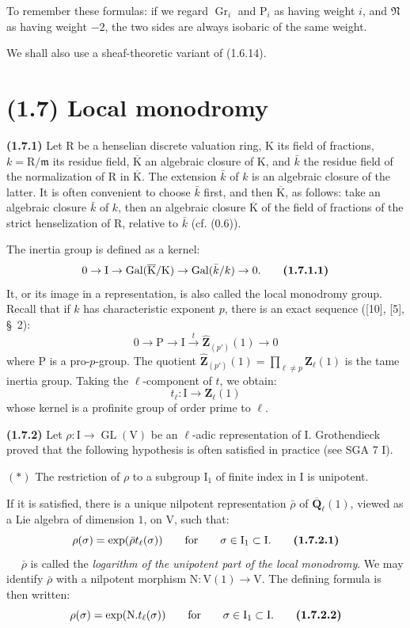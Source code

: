 \documentclass[11pt,leqno]{article}
\newcommand{\Page}[1]{\ifvmode\noindent\else\unskip\ \fi{\footnotesize\textcolor{gray}{[p.\,#1]}}\ \ignorespaces}
\begin{document}
To remember these formulas: if we regard \(\operatorname{Gr}_i\) and \(\mathrm{P}_i\) as having weight \(i\), and \(\mathfrak{N}\) as having weight \(-2\), the two sides are always isobaric of the same weight.

We shall also use a sheaf-theoretic variant of (1.6.14).

\section*{(1.7) Local monodromy}

\textbf{(1.7.1)} Let \(\mathrm{R}\) be a henselian discrete valuation ring, \(\mathrm{K}\) its field of fractions, \(k=\mathrm{R}/\mathfrak{m}\) its residue field, \(\overline{\mathrm{K}}\) an algebraic closure of \(\mathrm{K}\), and \(\bar{k}\) the residue field of the normalization of \(\mathrm{R}\) in \(\overline{\mathrm{K}}\). The extension \(\bar{k}\) of \(k\) is an algebraic closure of the latter. It is often convenient to choose \(\bar{k}\) first, and then \(\overline{\mathrm{K}}\), as follows: take an algebraic closure \(\bar{k}\) of \(k\), then an algebraic closure \(\overline{\mathrm{K}}\) of the field of fractions of the strict henselization of \(\mathrm{R}\), relative to \(\bar{k}\) (cf. (0.6)).

The inertia group is defined as a kernel:
\[
0\to\mathrm{I}\to
\operatorname{Gal}(\overline{\mathrm{K}}/\mathrm{K})
\to\operatorname{Gal}(\bar{k}/k)\to0.
\tag*{\textbf{(1.7.1.1)}}
\]
It, or its image in a representation, is also called the local monodromy group. Recall that if \(k\) has characteristic exponent \(p\), there is an exact sequence ([10], [5], \S~2):
\[
0\to\mathrm{P}\to\mathrm{I}
\xrightarrow{t}\widehat{\mathbf{Z}}_{(p')}(1)\to0
\]
where \(\mathrm{P}\) is a pro-\(p\)-group. The quotient \(\widehat{\mathbf{Z}}_{(p')}(1)=\prod\limits_{\ell\neq p}\mathbf{Z}_\ell(1)\) is the tame inertia group. Taking the \(\ell\)-component of \(t\), we obtain:
\[
t_\ell:\mathrm{I}\to\mathbf{Z}_\ell(1)
\]
whose kernel is a profinite group of order prime to \(\ell\).

\textbf{(1.7.2)} Let \(\rho:\mathrm{I}\to\operatorname{GL}(\mathrm{V})\) be an \(\ell\)-adic representation of \(\mathrm{I}\). Grothendieck proved that the following hypothesis is often satisfied in practice (see SGA 7 I).

\((*)\) The restriction of \(\rho\) to a subgroup \(\mathrm{I}_1\) of finite index in \(\mathrm{I}\) is unipotent.

If it is satisfied, there is a unique nilpotent representation \(\bar{\rho}\) of \(\overline{\mathbf{Q}}_\ell(1)\), viewed as a Lie algebra of dimension \(1\), on \(\mathrm{V}\), such that:
\[
\rho(\sigma)=\exp(\bar{\rho}t_\ell(\sigma))
\qquad\text{for}\qquad\sigma\in\mathrm{I}_1\subset\mathrm{I}.
\tag*{\textbf{(1.7.2.1)}}
\]
\Page{171}
\(\bar{\rho}\) is called the \textit{logarithm of the unipotent part of the local monodromy}. We may identify \(\bar{\rho}\) with a nilpotent morphism \(\mathrm{N}:\mathrm{V}(1)\to\mathrm{V}\). The defining formula is then written:
\[
\rho(\sigma)=\exp(\mathrm{N}.t_\ell(\sigma))
\qquad\text{for}\qquad\sigma\in\mathrm{I}_1\subset\mathrm{I}.
\tag*{\textbf{(1.7.2.2)}}
\]
\end{document}
